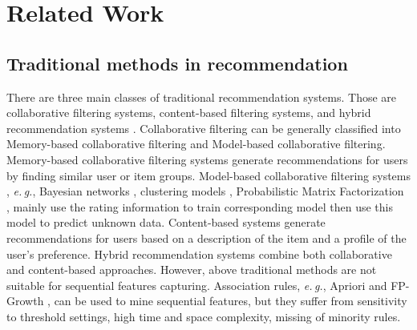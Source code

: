 \documentclass[runningheads]{llncs}
\begin{document}
\section{Related Work}
\subsection{Traditional methods in recommendation}

There are three main classes of traditional recommendation systems. Those are collaborative filtering systems, content-based filtering systems, and hybrid recommendation systems \cite{Adomavicius2013Toward}. Collaborative filtering can be generally classified into Memory-based \cite{Resnick:1994:GOA:192844.192905,sarwar2001item} collaborative filtering and Model-based \cite{chien1999bayesian,ungar1998clustering,mnih2008probabilistic} collaborative filtering. Memory-based collaborative filtering \cite{Resnick:1994:GOA:192844.192905,sarwar2001item,chien1999bayesian,ungar1998clustering} systems generate recommendations for users by finding similar user or item groups. Model-based collaborative filtering systems , \emph{e.\,g.}, Bayesian networks \cite{chien1999bayesian}, clustering models \cite{ungar1998clustering}, Probabilistic Matrix Factorization \cite{mnih2008probabilistic}, mainly use the rating information to train corresponding model then use this model to predict unknown data. Content-based systems \cite{balabanovic1997fab} generate recommendations for users based on a description of the item and a profile of the user's preference. Hybrid recommendation systems \cite{burke2002hybrid} combine both collaborative and content-based approaches. However, above traditional methods are not suitable for sequential features capturing. Association rules, \emph{e.\,g.}, Apriori \cite{agrawal1993mining} and FP-Growth \cite{li2008pfp}, can be used to mine sequential features, but they suffer from sensitivity to threshold settings, high time and space complexity, missing of minority rules.
\end{document}

